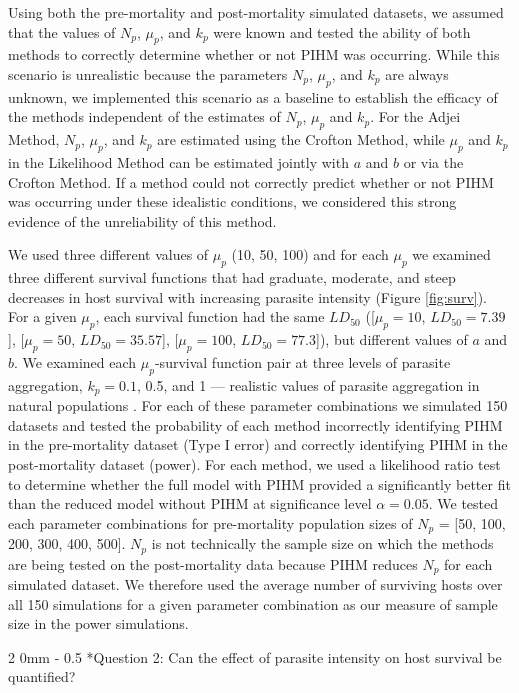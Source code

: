 \documentclass[12pt, a4paper]{article}
\makeatletter
\renewcommand{\subsection}{\@startsection
{subsection}%
{2}%
{0mm}%
{-\baselineskip}%
{0.5\baselineskip}%
{\normalfont\bf}} %
\makeatother
\begin{document}
Using both the pre-mortality and post-mortality simulated datasets,  we assumed
that the values of $N_p$, $\mu_p$, and $k_p$ were known and tested the ability of both methods to correctly determine whether or not PIHM was occurring.  While this scenario is unrealistic because the parameters $N_p$,
$\mu_p$, and $k_p$ are always unknown, we implemented this scenario as a baseline to
establish the efficacy of the methods independent of the estimates of $N_p$, $\mu_p$ and $k_p$.  For the Adjei Method, $N_p$, $\mu_p$, and $k_p$ are estimated using the Crofton Method, while $\mu_p$ and $k_p$ in the Likelihood Method can be estimated jointly with $a$ and $b$ or via the Crofton Method.   If a
method could not correctly predict whether or not PIHM was occurring under these idealistic conditions, we considered this strong evidence of the unreliability of this method.

We used three different values of $\mu_p$ (10, 50, 100) and for each $\mu_p$ we examined three different survival functions that had graduate, moderate, and steep decreases in host survival with increasing parasite intensity (Figure \ref{fig:surv}).  For a given $\mu_p$, each survival function had the same $LD_{50}$ ([$\mu_p = 10$, $LD_{50} = 7.39$], [$\mu_p = 50$, $LD_{50} = 35.57$], [$\mu_p = 100$, $LD_{50}= 77.3$]),  but different values of $a$ and $b$.  We examined each $\mu_p$-survival function pair at  three levels of parasite
aggregation, $k_p = 0.1$, 0.5, and 1 --- realistic values of parasite aggregation in natural populations \citep{Shaw1998}.  For each of these parameter
combinations we simulated 150 datasets and tested the probability of each method incorrectly identifying PIHM in the pre-mortality dataset (Type I error) and correctly identifying PIHM in the post-mortality dataset (power).  For each method, we used a likelihood ratio test to determine whether the full model with PIHM provided a significantly better fit than the reduced model without PIHM at significance level $\alpha = 0.05$.  We tested each parameter combinations for pre-mortality population sizes of $N_p$ = [50, 100, 200, 300, 400, 500]. $N_p$ is not technically the sample size on which the methods are being
tested on the post-mortality data because PIHM reduces $N_p$ for each simulated
dataset.  We therefore used the average number of surviving hosts over all 150 simulations for a given parameter combination as our measure of sample size in the power simulations.

\subsection*{Question 2: Can the effect of parasite intensity on host survival be quantified?}
\end{document}
